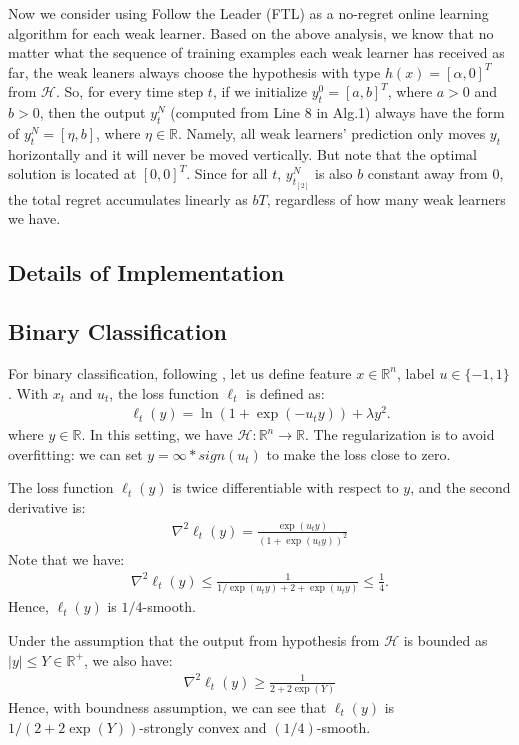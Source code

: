 Now we consider using Follow the Leader (FTL) as a no-regret online learning algorithm for each weak learner. Based on the above analysis, we know that no matter what the sequence of training examples each weak learner has received as far, the weak leaners always choose the hypothesis with type $h(x) = [\alpha,0]^T$ from $\mathcal{H}$. So, for every time step $t$, if we initialize $y_t^0 = [a,b]^T$, where $a>0$ and $b>0$, then the output $y_t^N$ (computed from Line 8 in Alg.1) always have the form of $y_t^N = [\eta, b]$, where $\eta\in\mathbb{R}$. Namely, all weak learners' prediction only moves $y_t$ horizontally and it will never be moved vertically. But note that the optimal solution is located at $[0,0]^T$. Since for all $t$, $y_{t_{[2]}}^N$ is also $b$ constant away from $0$, the total regret accumulates linearly as $bT$, regardless of how many weak learners we have. 


\subsection{Details of  Implementation}
\label{sec:implementation}
\subsection{Binary Classification}
For binary classification, following \citep{friedman2001greedy}, let us define feature $x\in\mathbb{R}^n$, label $u\in\{-1,1\}$. With $x_t$ and $u_t$, the loss function $\ell_t$ is defined as:
\begin{align}
\ell_t(y) = \ln(1 + \exp(-u_t y)) + \lambda y^2.
\end{align} where $y\in\mathbb{R}$. In this setting, we have $\mathcal{H}: \mathbb{R}^n\rightarrow \mathbb{R}$. The regularization is to avoid overfitting: we can set $y = \infty*sign(u_t)$ to make the loss close to zero. 

The loss function $\ell_t(y)$ is twice differentiable with respect to $y$, and the second derivative is:
\begin{align}
\nabla^2\ell_t(y) = \frac{\exp(u_t y)}{(1+\exp(u_t y))^2}
\end{align}
Note that we have:
\begin{align}
\nabla^2\ell_t(y) \leq \frac{1}{1/\exp(u_t y) + 2 + \exp(u_t y)} \leq \frac{1}{4}.
\end{align} Hence, $\ell_t(y)$ is $1/4$-smooth.

Under the assumption that the output from hypothesis from $\mathcal{H}$ is bounded as $|y| \leq Y\in\mathbb{R}^+$, we also have:
\begin{align}
\nabla^2\ell_t(y) \geq \frac{1}{2+2\exp(Y)}
\end{align}
Hence, with boundness assumption, we can see that $\ell_t(y)$ is $1/(2+2\exp(Y))$-strongly convex and $(1/4)$-smooth. 

